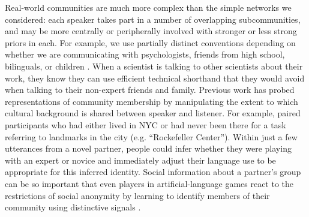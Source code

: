 

Real-world communities are much more complex than the simple networks we considered: each speaker takes part in a number of overlapping subcommunities, and may be more centrally or peripherally involved with stronger or less strong priors in each. 
For example, we use partially distinct conventions depending on whether we are communicating with psychologists, friends from high school, bilinguals, or children \cite{auer_code-switching_2013}.
When a scientist is talking to other scientists about their work, they know they can use efficient technical shorthand that they would avoid when talking to their non-expert friends and family. 
Previous work has probed representations of community membership by manipulating the extent to which cultural background is shared between speaker and listener.
For example,  paired participants who had either lived in NYC or had never been there for a task referring to landmarks in the city (e.g. ``Rockefeller Center''). 
Within just a few utterances from a novel partner, people could infer whether they were playing with an expert or novice and immediately adjust their language use to be appropriate for this inferred identity. 
Social information about a partner’s group can be so important that even players in artificial-language games react to the restrictions of social anonymity by learning to identify members of their community using distinctive signals \cite{roberts_experimental_2010}.

